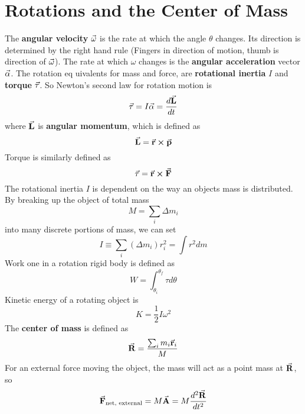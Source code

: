 \section{Rotations and the Center of Mass}
    The \textbf{angular velocity} $\va{\omega}$ is the rate at which the angle $\theta$ changes. Its direction is determined by the right hand rule (Fingers in direction of motion, thumb is direction of $\va{\omega}$). The rate at which $\omega$ changes is the \textbf{angular acceleration} vector $\va{\alpha}$. The rotation eq uivalents for mass and force, are \textbf{rotational inertia} $I$ and \textbf{torque} $\va{\tau}$. So Newton's second law for rotation motion is
    \begin{equation*}
        \va{\tau} = I\va{\alpha} = \frac{d\va{L}}{dt}
    \end{equation*}
    where $\va{L}$ is \textbf{angular momentum}, which is defined as $$\va{L} = \va{r} \cross \va{p}$$
    Torque is similarly defined as $$\va{\tau} = \va{r} \cross \va{F}$$
    The rotational inertia $I$ is dependent on the way an objects mass is distributed. By breaking up the object of total mass $$M = \sum_i \Delta m_i$$ into many discrete portions of mass, we can set
    \begin{equation*}
        I \equiv \sum_i (\Delta m_i) r_i^2 = \int r^2 dm
    \end{equation*}
    Work one in a rotation rigid body is defined as 
    \begin{equation*}
        W = \int_{\theta_i}^{\theta_f} \tau d\theta
    \end{equation*}
    Kinetic energy of a rotating object is
    \begin{equation*}
        K = \frac{1}{2}I\omega^2
    \end{equation*}
    The \textbf{center of mass} is defined as 
    \begin{equation*}
        \va{R} = \frac{\sum_i m_i\va{r}_i}{M}
    \end{equation*}
    For an external force moving the object, the mass will act as a point mass at $\va{R}$, so 
    \begin{equation*}
        \va{F}_{\text{net, external}} = M\va{A} = M\frac{d^2\va{R}}{dt^2}
    \end{equation*}